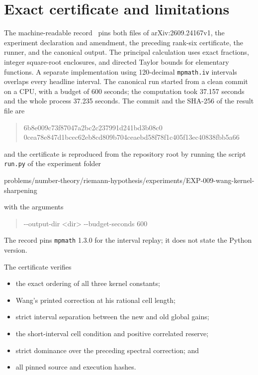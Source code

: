\documentclass[11pt]{article}
\theoremstyle{remark}
\begin{document}
\section{Exact certificate and limitations}

The machine-readable record~\cite{RecordIX} pins both files of
arXiv:2609.24167v1, the experiment declaration and amendment, the preceding
rank-six certificate, the runner, and the canonical output.  The principal
calculation uses exact fractions, integer square-root enclosures, and directed
Taylor bounds for elementary functions.  A separate implementation using
120-decimal \texttt{mpmath.iv} intervals overlaps every headline interval.
The canonical run started from a clean commit on a CPU, with a budget of 600
seconds; the computation took 37.157 seconds and the whole process 37.235
seconds.  The commit and the SHA-256 of the result file are
\begin{quote}\small\ttfamily
6b8e009c73f87047a2bc2c237991d241bd3b08c0\\
0cea78e847d1bcec62eb8cd809b704ceaebd58f78f1c405f13ec40838fbb5a66
\end{quote}
and the certificate is reproduced from the repository root by running the script
\texttt{run.py} of the experiment folder
\begin{flushleft}\footnotesize\ttfamily
problems/number-theory/riemann-hypothesis/experiments/EXP-009-wang-kernel-sharpening
\end{flushleft}
with the arguments
\begin{quote}\small\ttfamily
-{}-output-dir <dir> -{}-budget-seconds 600
\end{quote}
The record pins \texttt{mpmath} 1.3.0 for the interval replay; it does not state the
Python version.

The certificate verifies
\begin{itemize}
\item the exact ordering of all three kernel constants;
\item Wang's printed correction at his rational cell length;
\item strict interval separation between the new and old global gains;
\item the short-interval cell condition and positive correlated reserve;
\item strict dominance over the preceding spectral correction; and
\item all pinned source and execution hashes.
\end{itemize}
\end{document}
